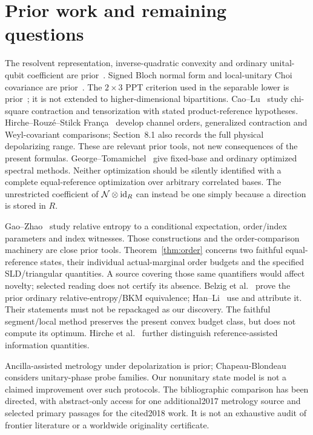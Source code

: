 \section{Prior work and remaining questions}\label{sec:prior}
The resolvent representation, inverse-quadratic convexity and ordinary unital-qubit coefficient are prior~\cite{HR}. Signed Bloch normal form and local-unitary Choi covariance are prior~\cite{RSW}. The \(2\times3\) PPT criterion used in the separable lower is prior~\cite{HHH}; it is not extended to higher-dimensional bipartitions.
Cao--Lu~\cite{CL} study chi-square contraction and tensorization with stated product-reference hypotheses. Hirche--Rouz\'e--Stilck Fran\c{c}a~\cite{HRF} develop channel orders, generalized contraction and Weyl-covariant comparisons; Section~8.1 also records the full physical depolarizing range. These are relevant prior tools, not new consequences of the present formulas. George--Tomamichel~\cite{GT} give fixed-base and ordinary optimized spectral methods. Neither optimization should be silently identified with a complete equal-reference optimization over arbitrary correlated bases. The unrestricted coefficient of \(\mathcal N\otimes\operatorname{id}_R\) can instead be one simply because a direction is stored in \(R\).

Gao--Zhao~\cite{GZ} study relative entropy to a conditional expectation, order/index parameters and index witnesses. Those constructions and the order-comparison machinery are close prior tools. Theorem~\ref{thm:order} concerns two faithful equal-reference states, their individual actual-marginal order budgets and the specified SLD/triangular quantities. A source covering those same quantifiers would affect novelty; selected reading does not certify its absence. Belzig et al.~\cite[Section~4.1, Lemma~4.1]{Reverse} prove the prior ordinary relative-entropy/BKM equivalence; Han--Li~\cite[Section~2.2, Lemma~1]{HanLi} use and attribute it. Their statements must not be repackaged as our discovery. The faithful segment/local method preserves the present convex budget class, but does not compute its optimum. Hirche et al.~\cite{Conditional} further distinguish reference-assisted information quantities.

Ancilla-assisted metrology under depolarization is prior; Chapeau-Blondeau~\cite{CB} considers unitary-phase probe families. Our nonunitary state model is not a claimed improvement over such protocols. The bibliographic comparison has been directed, with abstract-only access for one additional2017 metrology source and selected primary passages for the cited2018 work. It is not an exhaustive audit of frontier literature or a worldwide originality certificate.

